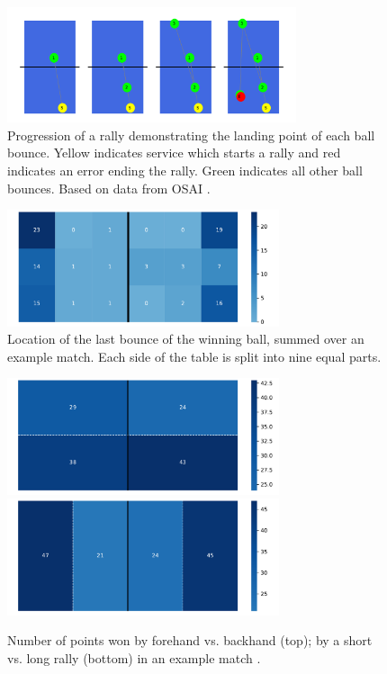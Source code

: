 \begin{figure}[ht]
\centering

\includegraphics[width=8.5cm]{plots/chiang1.pdf}
\caption{Progression of a rally demonstrating the landing point of each ball bounce. Yellow indicates service which starts a rally and red indicates an error ending the rally. Green indicates all other ball bounces. Based on data from OSAI  \cite{OSAI}.}

\label{fig:sequence}
\end{figure}

\begin{figure}[ht]
\centering

\includegraphics[width=8cm]{plots/chiang2.pdf}
\caption{Location of the last bounce of the winning ball, summed over an example match. Each side of the table is split into nine equal parts.}

\label{fig:pos}
\end{figure}


\begin{figure}[t]
\centering
\includegraphics[width=8cm]{plots/chiang3a.pdf}
\includegraphics[width=8cm]{plots/chiang3b.pdf}
\caption{Number of points won by forehand vs. backhand (top);  by a short vs. long rally (bottom) in an example match \cite{OSAI}.}

\label{fig:svlr}
\end{figure}

